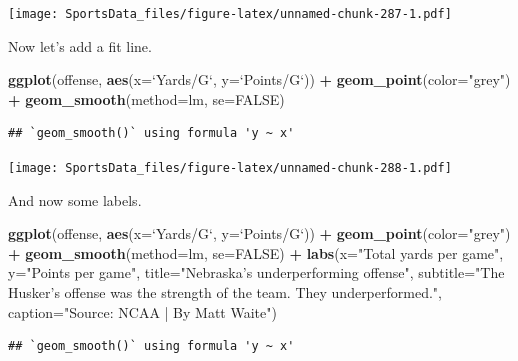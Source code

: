 \documentclass[
]{book}
\newenvironment{Shaded}{\begin{snugshade}}{\end{snugshade}}
\newcommand{\DataTypeTok}[1]{\textcolor[rgb]{0.13,0.29,0.53}{#1}}
\newcommand{\KeywordTok}[1]{\textcolor[rgb]{0.13,0.29,0.53}{\textbf{#1}}}
\newcommand{\NormalTok}[1]{#1}
\newcommand{\OperatorTok}[1]{\textcolor[rgb]{0.81,0.36,0.00}{\textbf{#1}}}
\newcommand{\OtherTok}[1]{\textcolor[rgb]{0.56,0.35,0.01}{#1}}
\newcommand{\StringTok}[1]{\textcolor[rgb]{0.31,0.60,0.02}{#1}}
\begin{document}
\texttt{[image: SportsData\_files/figure-latex/unnamed-chunk-287-1.pdf]}

Now let's add a fit line.

\begin{Shaded}
\begin{Highlighting}[]
\KeywordTok{ggplot}\NormalTok{(offense, }\KeywordTok{aes}\NormalTok{(}\DataTypeTok{x=}\StringTok{`}\DataTypeTok{Yards/G}\StringTok{`}\NormalTok{, }\DataTypeTok{y=}\StringTok{`}\DataTypeTok{Points/G}\StringTok{`}\NormalTok{)) }\OperatorTok{+}\StringTok{ }
\StringTok{  }\KeywordTok{geom_point}\NormalTok{(}\DataTypeTok{color=}\StringTok{"grey"}\NormalTok{) }\OperatorTok{+}\StringTok{ }\KeywordTok{geom_smooth}\NormalTok{(}\DataTypeTok{method=}\NormalTok{lm, }\DataTypeTok{se=}\OtherTok{FALSE}\NormalTok{)}
\end{Highlighting}
\end{Shaded}

\begin{verbatim}
## `geom_smooth()` using formula 'y ~ x'
\end{verbatim}

\texttt{[image: SportsData\_files/figure-latex/unnamed-chunk-288-1.pdf]}

And now some labels.

\begin{Shaded}
\begin{Highlighting}[]
\KeywordTok{ggplot}\NormalTok{(offense, }\KeywordTok{aes}\NormalTok{(}\DataTypeTok{x=}\StringTok{`}\DataTypeTok{Yards/G}\StringTok{`}\NormalTok{, }\DataTypeTok{y=}\StringTok{`}\DataTypeTok{Points/G}\StringTok{`}\NormalTok{)) }\OperatorTok{+}\StringTok{ }
\StringTok{  }\KeywordTok{geom_point}\NormalTok{(}\DataTypeTok{color=}\StringTok{"grey"}\NormalTok{) }\OperatorTok{+}\StringTok{ }\KeywordTok{geom_smooth}\NormalTok{(}\DataTypeTok{method=}\NormalTok{lm, }\DataTypeTok{se=}\OtherTok{FALSE}\NormalTok{) }\OperatorTok{+}\StringTok{ }
\StringTok{  }\KeywordTok{labs}\NormalTok{(}\DataTypeTok{x=}\StringTok{"Total yards per game"}\NormalTok{, }\DataTypeTok{y=}\StringTok{"Points per game"}\NormalTok{, }\DataTypeTok{title=}\StringTok{"Nebraska's underperforming offense"}\NormalTok{, }\DataTypeTok{subtitle=}\StringTok{"The Husker's offense was the strength of the team. They underperformed."}\NormalTok{, }\DataTypeTok{caption=}\StringTok{"Source: NCAA | By Matt Waite"}\NormalTok{)}
\end{Highlighting}
\end{Shaded}

\begin{verbatim}
## `geom_smooth()` using formula 'y ~ x'
\end{verbatim}
\end{document}
